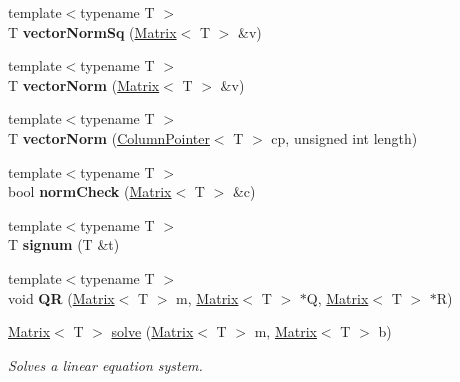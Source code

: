 \begin{DoxyCompactItemize}
{\footnotesize template$<$typename T $>$ }\\T {\bfseries vector\+Norm\+Sq} (\mbox{\hyperlink{classcore_1_1_matrix}{Matrix}}$<$ T $>$ \&v)
\item 
\mbox{\label{namespacecore_a25f5a82e60ecc8c6790e09d62b1c3bf0}} 
{\footnotesize template$<$typename T $>$ }\\T {\bfseries vector\+Norm} (\mbox{\hyperlink{classcore_1_1_matrix}{Matrix}}$<$ T $>$ \&v)
\item 
\mbox{\label{namespacecore_ac7268b3bde23ef7ca50fbd9e2532696a}} 
{\footnotesize template$<$typename T $>$ }\\T {\bfseries vector\+Norm} (\mbox{\hyperlink{classcore_1_1_column_pointer}{Column\+Pointer}}$<$ T $>$ cp, unsigned int length)
\item 
\mbox{\label{namespacecore_a8bf120c26c4c4ed9bf13e71ecec1e39e}} 
{\footnotesize template$<$typename T $>$ }\\bool {\bfseries norm\+Check} (\mbox{\hyperlink{classcore_1_1_matrix}{Matrix}}$<$ T $>$ \&c)
\item 
\mbox{\label{namespacecore_abc475887ff943e3e13239581b4a01b45}} 
{\footnotesize template$<$typename T $>$ }\\T {\bfseries signum} (T \&t)
\item 
\mbox{\label{namespacecore_af1aea3d6a184eac75093e772d5983f01}} 
{\footnotesize template$<$typename T $>$ }\\void {\bfseries QR} (\mbox{\hyperlink{classcore_1_1_matrix}{Matrix}}$<$ T $>$ m, \mbox{\hyperlink{classcore_1_1_matrix}{Matrix}}$<$ T $>$ $\ast$Q, \mbox{\hyperlink{classcore_1_1_matrix}{Matrix}}$<$ T $>$ $\ast$R)
\item 
\mbox{\hyperlink{classcore_1_1_matrix}{Matrix}}$<$ T $>$ \mbox{\hyperlink{namespacecore_a8e026b46f671dd953967abc95887e364}{solve}} (\mbox{\hyperlink{classcore_1_1_matrix}{Matrix}}$<$ T $>$ m, \mbox{\hyperlink{classcore_1_1_matrix}{Matrix}}$<$ T $>$ b)
\begin{DoxyCompactList}\small\item\em Solves a linear equation system. \end{DoxyCompactList}\end{DoxyCompactItemize}


